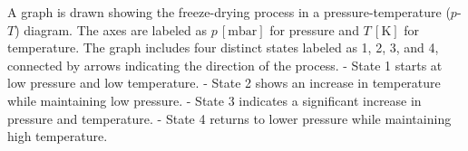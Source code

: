 A graph is drawn showing the freeze-drying process in a pressure-temperature (\( p \)-\( T \)) diagram. The axes are labeled as \( p \, [\text{mbar}] \) for pressure and \( T \, [\text{K}] \) for temperature. The graph includes four distinct states labeled as 1, 2, 3, and 4, connected by arrows indicating the direction of the process.  
- State 1 starts at low pressure and low temperature.  
- State 2 shows an increase in temperature while maintaining low pressure.  
- State 3 indicates a significant increase in pressure and temperature.  
- State 4 returns to lower pressure while maintaining high temperature.
